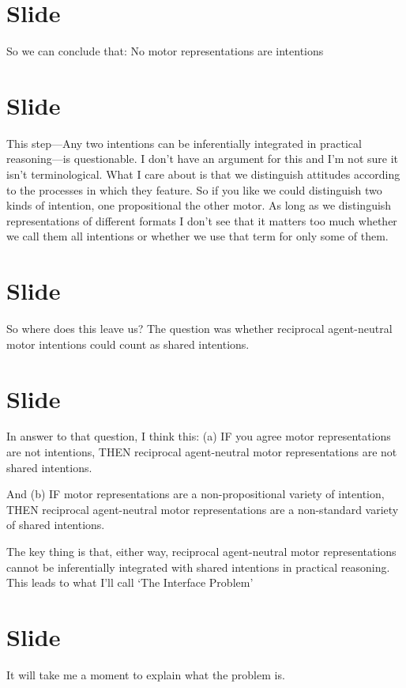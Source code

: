 \documentclass[12pt,\papersize]{extarticle}
\begin{document}
\section{Slide}
So we can conclude that:
 No motor representations are intentions



\section{Slide}
This step---Any two intentions can be inferentially integrated in practical reasoning---is questionable.  I don’t have an argument for this and I’m not sure it isn’t terminological.  
What I care about is that we distinguish attitudes according to the processes in which they feature.
So if you like we could distinguish two kinds of intention, one propositional the other motor.
As long as we distinguish representations of different formats I don’t see that it matters too much whether we call them all intentions or whether we use that term for only some of them.




\section{Slide}
So where does this leave us?
The question was whether reciprocal agent-neutral motor intentions could count as shared intentions.




\section{Slide}
In answer to that question, I think this:
(a)
IF you agree motor representations are not intentions,
THEN reciprocal agent-neutral motor representations are not shared intentions.

And
(b)
IF motor representations are a non-propositional variety of intention,
THEN reciprocal agent-neutral motor representations are a non-standard variety of shared intentions.

The key thing is that, either way, reciprocal agent-neutral motor representations cannot be inferentially integrated with shared intentions in practical reasoning.
This leads to what I’ll call ‘The Interface Problem’


\section{Slide}
It will take me a moment to explain what the problem is.
\end{document}
